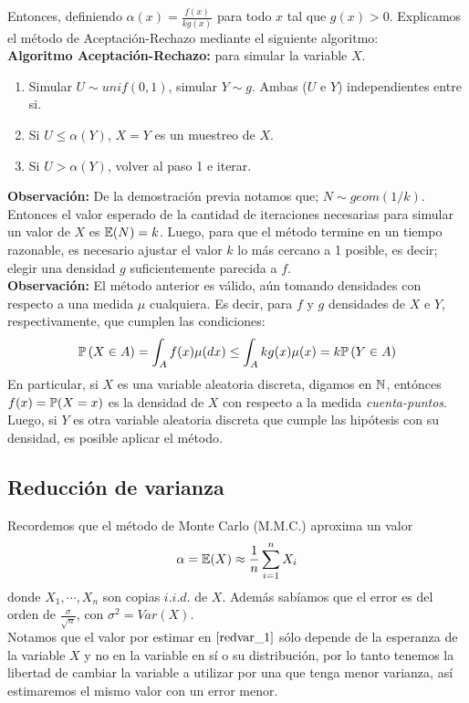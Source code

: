 Entonces, definiendo $\alpha(x) = \frac{f(x)}{kg(x)}$ para todo $x$ tal que $g(x)>0$. Explicamos el método de Aceptación-Rechazo mediante el siguiente algoritmo:\\ \newline
\textbf{Algoritmo Aceptación-Rechazo:} para simular la variable $X$.
\begin{enumerate}
    \item Simular $U\sim unif(0,1)$, simular $Y\sim g$. Ambas ($U$ e $Y$) independientes entre si.
    \item Si $U\leq \alpha(Y)$, $X=Y$ es un muestreo de $X$.
    \item Si $U> \alpha(Y)$, volver al paso 1 e iterar.
\end{enumerate}
\newline
\textbf{Observación: }De la demostración previa notamos que; $N\sim geom(1/k)$. Entonces el valor esperado de la cantidad de iteraciones necesarias para simular un valor de $X$ es $\mathbb E(N) = k$. Luego, para que el método termine en un tiempo razonable, es necesario ajustar el valor $k$ lo más cercano a 1 posible, es decir; elegir una densidad $g$ suficientemente parecida a $f$.\\ \newline
\textbf{Observación: }El método anterior es válido, aún tomando densidades con respecto a una medida $\mu$ cualquiera. Es decir, para $f$ y $g$ densidades de $X$ e $Y$, respectivamente, que cumplen las condiciones:
\[\mathbb{P}\left(X\in A\right) = \int_{A}f(x)\mu(dx) \leq \int_{A}kg(x)\mu(x) = k\mathbb{P}\left(Y\in A\right)\]
En particular, si $X$ es una variable aleatoria discreta, digamos en $\mathbb N$, entónces $f(x) = \mathbb{P}(X=x)$ es la densidad de $X$ con respecto a la medida \textit{cuenta-puntos}. Luego, si $Y$ es otra variable aleatoria discreta que cumple las hipótesis con su densidad, es posible aplicar el método.

\subsection{Reducción de varianza}
Recordemos que el método de Monte Carlo (M.M.C.) aproxima un valor
\begin{equation}
    \alpha = \mathbb E(X) \approx \frac{1}{n}\sum_{i=1}^{n}X_i
    \label{redvar_1}
\end{equation}
donde $X_1,\cdots,X_n$ son copias $i.i.d.$ de $X$. Además sabíamos que el error es del orden de
$\frac{\sigma}{\sqrt{n}}$, con $\sigma^2 = Var(X)$.\\
Notamos que el valor por estimar en $\ref{redvar_1}$ sólo depende de la esperanza de la variable $X$ y no en la variable en sí o su distribución, por lo tanto tenemos la libertad de cambiar la variable a utilizar por una que tenga menor varianza, así estimaremos el mismo valor con un error menor.

